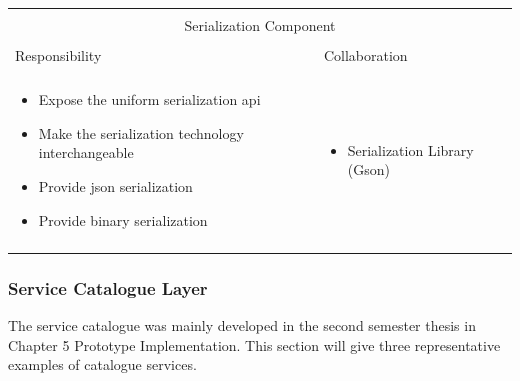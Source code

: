 \vspace{0.5cm} \noindent 
\begin{tabular}{|l|l|}
    \cline{1-2}
    \multicolumn{2}{|c|}{} \\[-0.3cm]
    \multicolumn{2}{|c|}{Serialization Component} \\ 
    \multicolumn{2}{|c|}{} \\[-0.3cm]
    \cline{1-2}
    Responsibility & Collaboration \\
    \cline{1-2}
    & \\[-0.2cm]
    \begin{minipage}{0.47\textwidth}
        \begin{itemize}
          \item Expose the uniform serialization \gls{api}
          \item Make the serialization technology interchangeable
          \item Provide \gls{json} serialization
          \item Provide binary serialization
        \end{itemize} 
    \end{minipage}
	&
    \begin{minipage}{0.47\textwidth}
        \begin{itemize}
          \item Serialization Library (Gson)
        \end{itemize} 
    \end{minipage}
	\\ & \\
    \hline
\end{tabular}

\subsubsection{Service Catalogue Layer}

The service catalogue was mainly developed in the second semester thesis
\cite{biedermann2016project2} in Chapter 5 Prototype Implementation.
This section will give three representative examples of catalogue services.\\


